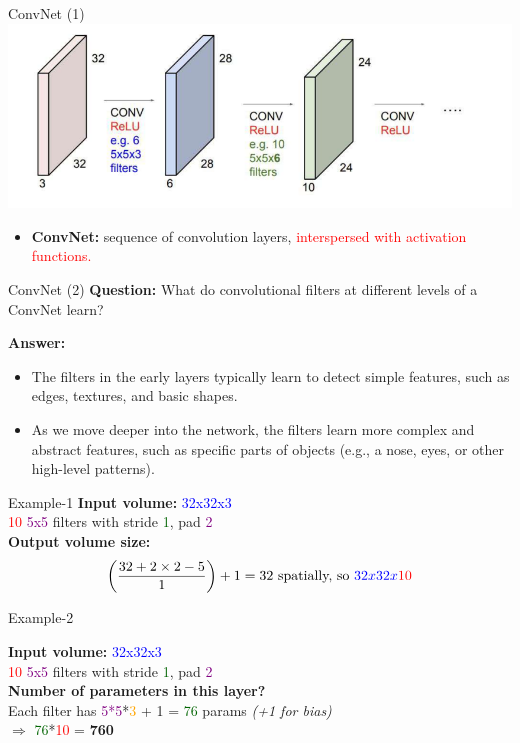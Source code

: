 \documentclass[serif, aspectratio=169]{beamer}
\begin{document}
	\begin{frame}{ConvNet (1)}
		\centering
		\includegraphics[keepaspectratio, scale=0.7]{pic/convnet.png}
		\smallskip
		\begin{itemize}
			\item \textbf {ConvNet:} sequence of convolution layers, \textcolor{red}{interspersed with activation functions.}
		\end{itemize}
	\end{frame}
	\begin{frame}{ConvNet (2)}
		\textbf{Question:}
		What do convolutional filters at different levels of a ConvNet learn?
		
		\bigskip
		
		\textbf{Answer:} 
		\begin{itemize}
			\item The filters in the early layers typically learn to detect simple features, such as edges, textures, and basic shapes.
			\item As we move deeper into the network, the filters learn more complex and abstract features, such as specific parts of objects (e.g., a nose, eyes, or other high-level patterns).
		\end{itemize}
	\end{frame}
	\begin{frame}{Example-1}
		\textbf{Input volume:} \textcolor{blue}{32x32x3}\\
		\textcolor{red}{10} \textcolor{purple}{5x5} filters with stride \textcolor{darkgreen}{1}, pad \textcolor{purple}{2}\\[10pt]
		
		\textbf{Output volume size:}\\
		\[
		\left(\frac{32 + 2 \times 2 - 5}{1}\right) + 1 = 32 \text{ spatially, so} \ \textcolor{blue}{32x32x}\textcolor{red}{10}
		\]
	\end{frame}
	\begin{frame}{Example-2}
		
		\textbf{Input volume:} \textcolor{blue}{32x32x3}\\
		\textcolor{red}{10} \textcolor{purple}{5x5} filters with stride \textcolor{darkgreen}{1}, pad \textcolor{purple}{2}\\[10pt]
		
		\textbf{Number of parameters in this layer?}\\
		Each filter has \textcolor{purple}{5*5}*\textcolor{orange}{3} + 1 = \textcolor{darkgreen}{76} params \hspace{5pt} \textit{(+1 for bias)}\\
		$\Rightarrow$ \textcolor{darkgreen}{76}*\textcolor{red}{10} = \textbf{760}
	\end{frame}
\end{document}
